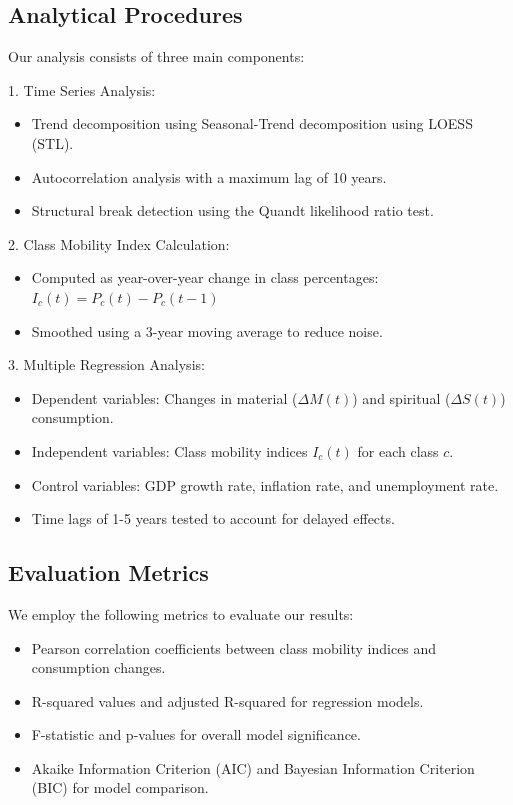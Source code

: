 \documentclass{article} %
\begin{document}
\subsection{Analytical Procedures}
Our analysis consists of three main components:

1. Time Series Analysis:
   \begin{itemize}
      \item Trend decomposition using Seasonal-Trend decomposition using LOESS (STL).
      \item Autocorrelation analysis with a maximum lag of 10 years.
      \item Structural break detection using the Quandt likelihood ratio test.
   \end{itemize}

2. Class Mobility Index Calculation:
   \begin{itemize}
      \item Computed as year-over-year change in class percentages: $I_c(t) = P_c(t) - P_c(t-1)$
      \item Smoothed using a 3-year moving average to reduce noise.
   \end{itemize}

3. Multiple Regression Analysis:
   \begin{itemize}
      \item Dependent variables: Changes in material ($\Delta M(t)$) and spiritual ($\Delta S(t)$) consumption.
      \item Independent variables: Class mobility indices $I_c(t)$ for each class $c$.
      \item Control variables: GDP growth rate, inflation rate, and unemployment rate.
      \item Time lags of 1-5 years tested to account for delayed effects.
   \end{itemize}

\subsection{Evaluation Metrics}
We employ the following metrics to evaluate our results:
\begin{itemize}
    \item Pearson correlation coefficients between class mobility indices and consumption changes.
    \item R-squared values and adjusted R-squared for regression models.
    \item F-statistic and p-values for overall model significance.
    \item Akaike Information Criterion (AIC) and Bayesian Information Criterion (BIC) for model comparison.
\end{itemize}
\end{document}
